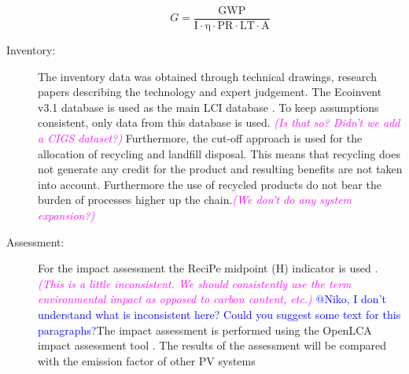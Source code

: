 \begin{description}
\begin{equation}
G=\frac{{\mathrm{GWP}}}{{\mathrm{I \cdot \eta  \cdot PR \cdot LT \cdot A}}}
\label{eq:solar}
\end{equation}



\item[Inventory:] The inventory data was obtained through technical drawings, research papers describing the technology and expert judgement. The Ecoinvent v3.1 database is used as the main LCI database \cite{frischknecht2005ecoinvent}. To keep assumptions consistent, only data from this database is used. \textcolor{magenta}{\textit{(Is that so? Didn't we add a CIGS dataset?)}} Furthermore, the cut-off approach is used for the allocation of recycling and landfill disposal. This means that recycling does not generate any credit for the product and resulting benefits are not taken into account. Furthermore the use of recycled products do not bear the burden of processes higher up the chain.\textcolor{magenta}{\textit{(We don't do any system expansion?)}}\\



\item[Assessment:] For the impact assessment the ReciPe midpoint (H) indicator is used \cite{zelm2009recipe}. \textcolor{magenta}{\textit{(This is a little inconsistent. We should consistently use the term environmental impact as opposed to carbon content, etc.)}} \textcolor{blue}{@Niko, I don't understand what is inconsistent here? Could you suggest some text for this paragraphs?}The impact assessment is performed using the OpenLCA impact assessment tool \cite{ciroth2007ict}. The results of the assessment will be compared with the emission factor of other PV systems \cite{raugei2007life}\\


\end{description}


